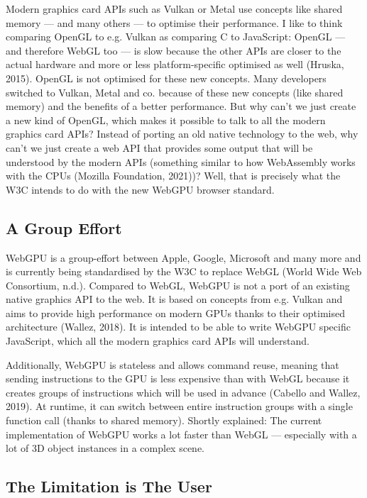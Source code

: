 \documentclass[10pt]{article}
\begin{document}
\begin{sloppypar}
  Modern graphics card APIs such as Vulkan or Metal use concepts like shared memory — and many others — to optimise their performance. I like to think comparing OpenGL to e.g. Vulkan as comparing C to JavaScript: OpenGL — and therefore WebGL too — is slow because the other APIs are closer to the actual hardware and more or less platform-specific optimised as well (Hruska, 2015). OpenGL is not optimised for these new concepts. Many developers switched to Vulkan, Metal and co. because of these new concepts (like shared memory) and the benefits of a better performance. But why can’t we just create a new kind of OpenGL, which makes it possible to talk to all the modern graphics card APIs? Instead of porting an old native technology to the web, why can’t we just create a web API that provides some output that will be understood by the modern APIs (something similar to how WebAssembly works with the CPUs (Mozilla Foundation, 2021))? Well, that is precisely what the W3C intends to do with the new WebGPU browser standard.

  \subsection{A Group Effort}
  \label{subsec:a-group-effort}

  WebGPU is a group-effort between Apple, Google, Microsoft and many more and is currently being standardised by the W3C to replace WebGL (World Wide Web Consortium, n.d.). Compared to WebGL, WebGPU is not a port of an existing native graphics API to the web. It is based on concepts from e.g. Vulkan and aims to provide high performance on modern GPUs thanks to their optimised architecture (Wallez, 2018). It is intended to be able to write WebGPU specific JavaScript, which all the modern graphics card APIs will understand.

  Additionally, WebGPU is stateless and allows command reuse, meaning that sending instructions to the GPU is less expensive than with WebGL because it creates groups of instructions which will be used in advance (Cabello and Wallez, 2019). At runtime, it can switch between entire instruction groups with a single function call (thanks to shared memory). Shortly explained: The current implementation of WebGPU works a lot faster than WebGL — especially with a lot of 3D object instances in a complex scene.

  \subsection{The Limitation is The User}
  \label{subsec:the-limitation-is-the-user}


\end{sloppypar}
\end{document}
